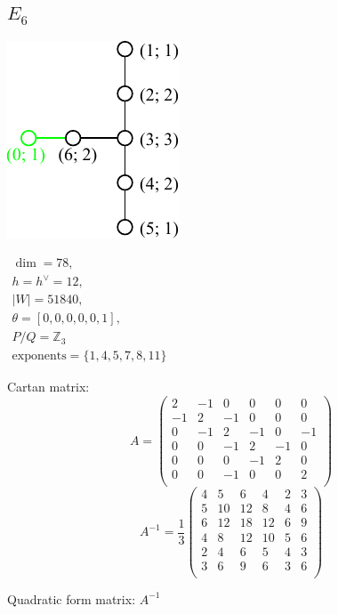 \documentclass[12pt]{article}
\newcommand{\Zb}{\mathbb{Z}}
\newcommand{\hc}{h^{\vee}}
\begin{document}
\subsection*{$E_6$}
\parbox{8cm}{\includegraphics{lie_E6.pdf}}
$
\begin{array}{l}
 \dim = 78, \\
  h=\hc= 12,\\
 |W|= 51840,\\
 \theta=[0,0,0,0,0,1],\\
 P/Q=\Zb_3 \\
 \text{exponents}={\{1,4,5,7,8,11\}}
\end{array}
$

Cartan matrix:
\[
A=\left(
\begin{array}{cccccc}
 2 &-1& 0& 0& 0&0   \\
 -1& 2&-1& 0& 0& 0 \\
 0 &-1& 2&-1& 0& -1 \\
 0 &0 &-1& 2&-1&  0\\
 0 &0 &0 &-1& 2&  0 \\
 0 &0 &-1 & 0& 0& 2\\
\end{array}
\right)\]
\[
A^{-1}=
\frac{1}{3}\left(
\begin{array}{cccccc}
  4& 5& 6& 4& 2& 3 \\
  5&10&12& 8& 4& 6 \\
  6&12&18&12& 6& 9 \\
  4& 8&12&10& 5& 6 \\
  2& 4& 6& 5& 4& 3 \\
  3& 6& 9& 6& 3& 6 \\
\end{array}
\right)
\]

Quadratic form matrix: $A^{-1}$

%
%
\newpage
%
\end{document}
